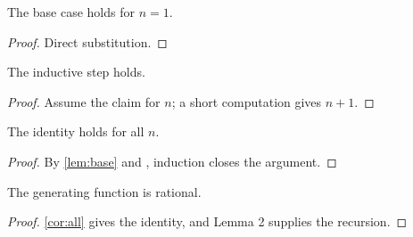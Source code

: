 \documentclass{article}
\begin{document}
\begin{lemma}\label{lem:base}
The base case holds for $n=1$.
\end{lemma}
\begin{proof}
Direct substitution.
\end{proof}

\begin{lemma}\label{lem:step}
The inductive step holds.
\end{lemma}
\begin{proof}
Assume the claim for $n$; a short computation gives $n+1$.
\end{proof}

\begin{corollary}\label{cor:all}
The identity holds for all $n$.
\end{corollary}
\begin{proof}
By \cref{lem:base} and , induction closes the argument.
\end{proof}

\begin{theorem}\label{thm:top}
The generating function is rational.
\end{theorem}
\begin{proof}
\cref{cor:all} gives the identity, and Lemma 2 supplies the recursion.
\end{proof}
\end{document}
